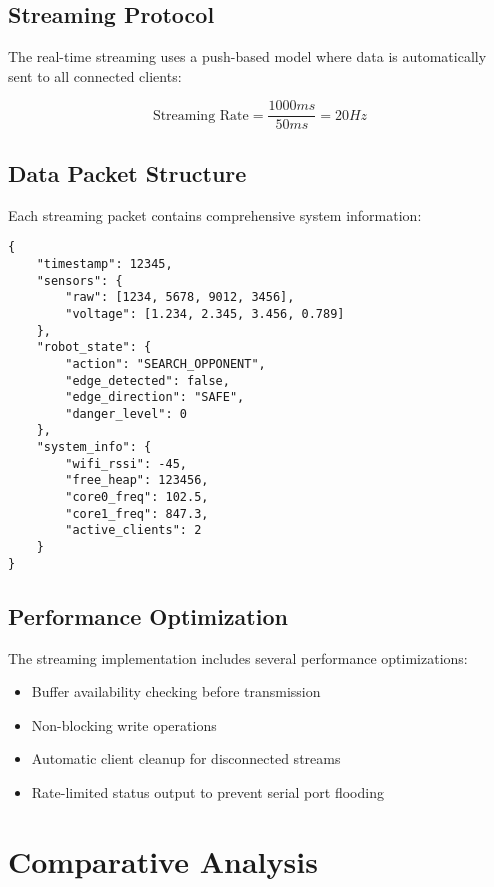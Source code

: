 \documentclass[12pt,a4paper]{article}
\begin{document}
\subsection{Streaming Protocol}

The real-time streaming uses a push-based model where data is automatically sent to all connected clients:

\begin{equation}
\text{Streaming Rate} = \frac{1000ms}{50ms} = 20Hz
\end{equation}

\subsection{Data Packet Structure}

Each streaming packet contains comprehensive system information:

\begin{lstlisting}[caption=JSON Data Packet Structure]
{
    "timestamp": 12345,
    "sensors": {
        "raw": [1234, 5678, 9012, 3456],
        "voltage": [1.234, 2.345, 3.456, 0.789]
    },
    "robot_state": {
        "action": "SEARCH_OPPONENT",
        "edge_detected": false,
        "edge_direction": "SAFE",
        "danger_level": 0
    },
    "system_info": {
        "wifi_rssi": -45,
        "free_heap": 123456,
        "core0_freq": 102.5,
        "core1_freq": 847.3,
        "active_clients": 2
    }
}
\end{lstlisting}

\subsection{Performance Optimization}

The streaming implementation includes several performance optimizations:

\begin{itemize}
    \item Buffer availability checking before transmission
    \item Non-blocking write operations
    \item Automatic client cleanup for disconnected streams
    \item Rate-limited status output to prevent serial port flooding
\end{itemize}

\section{Comparative Analysis}
\end{document}
